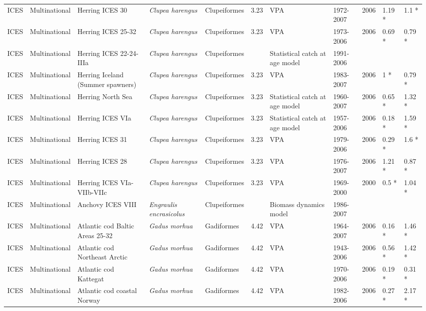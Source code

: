 \begin{longtable}{p{1.5cm}p{1.5cm}p{3cm}p{3cm}p{2.5cm}p{0.9cm}p{1.4cm}p{0.9cm}p{0.9cm}p{0.9cm}p{1cm}}
  ICES & Multinational & Herring ICES 30 & \textit{Clupea harengus} & Clupeiformes & 3.23 & VPA & 1972-2007 & 2006 & 1.19 * & 1.1 * \\ 
  ICES & Multinational & Herring ICES 25-32 & \textit{Clupea harengus} & Clupeiformes & 3.23 & VPA & 1973-2006 & 2006 & 0.69 * & 0.79 * \\ 
  ICES & Multinational & Herring ICES 22-24-IIIa & \textit{Clupea harengus} & Clupeiformes &  & Statistical catch at age model & 1991-2006 &  &  &  \\ 
  ICES & Multinational & Herring Iceland (Summer spawners) & \textit{Clupea harengus} & Clupeiformes & 3.23 & VPA & 1983-2007 & 2006 & 1 * & 0.79 * \\ 
  ICES & Multinational & Herring North Sea & \textit{Clupea harengus} & Clupeiformes & 3.23 & Statistical catch at age model & 1960-2007 & 2006 & 0.65 * & 1.32 * \\ 
  ICES & Multinational & Herring ICES VIa & \textit{Clupea harengus} & Clupeiformes & 3.23 & Statistical catch at age model & 1957-2006 & 2006 & 0.18 * & 1.59 * \\ 
  ICES & Multinational & Herring ICES 31 & \textit{Clupea harengus} & Clupeiformes & 3.23 & VPA & 1979-2006 & 2006 & 0.29 * & 1.6 * \\ 
  ICES & Multinational & Herring ICES 28 & \textit{Clupea harengus} & Clupeiformes & 3.23 & VPA & 1976-2007 & 2006 & 1.21 * & 0.87 * \\ 
  ICES & Multinational & Herring ICES VIa-VIIb-VIIc & \textit{Clupea harengus} & Clupeiformes & 3.23 & VPA & 1969-2000 & 2000 & 0.5 * & 1.04 * \\ 
  ICES & Multinational & Anchovy ICES VIII & \textit{Engraulis encrasicolus} & Clupeiformes &  & Biomass dynamics model & 1986-2007 &  &  &  \\ 
  ICES & Multinational & Atlantic cod Baltic Areas 25-32 & \textit{Gadus morhua} & Gadiformes & 4.42 & VPA & 1964-2007 & 2006 & 0.16 * & 1.46 * \\ 
  ICES & Multinational & Atlantic cod Northeast Arctic & \textit{Gadus morhua} & Gadiformes & 4.42 & VPA & 1943-2006 & 2006 & 0.56 * & 1.42 * \\ 
  ICES & Multinational & Atlantic cod Kattegat & \textit{Gadus morhua} & Gadiformes & 4.42 & VPA & 1970-2006 & 2006 & 0.19 * & 0.31 * \\ 
  ICES & Multinational & Atlantic cod coastal Norway & \textit{Gadus morhua} & Gadiformes & 4.42 & VPA & 1982-2006 & 2006 & 0.27 * & 2.17 * \\ 

\end{longtable}

